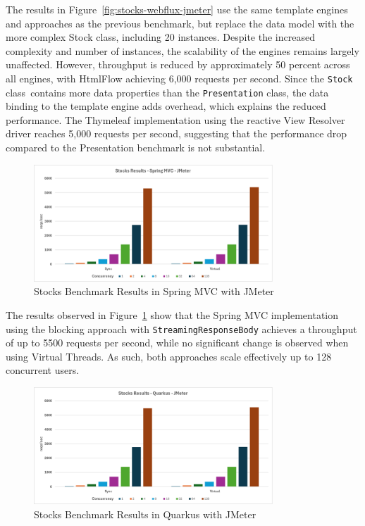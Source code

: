 The results in Figure~\ref{fig:stocks-webflux-jmeter} use the same template
engines and approaches as the previous benchmark, but replace the data model
with the more complex Stock class, including 20 instances. Despite the
increased complexity and number of instances, the scalability of the engines
remains largely unaffected. However, throughput is reduced by approximately 50
percent across all engines, with HtmlFlow achieving 6,000 requests per second.
Since the \texttt{Stock} class\ contains more data properties than the
\texttt{Presentation} class, the data binding to the template engine adds
overhead, which explains the reduced performance. The Thymeleaf implementation
using the reactive View Resolver driver reaches 5,000 requests per second,
suggesting that the performance drop compared to the Presentation benchmark is
not substantial.

\begin{figure}[h]
     \isPreprints{\centering}{}
     \includegraphics[width=0.8\textwidth]{./Graphs/stocks-springmvc-jmeter.png}
     \caption{Stocks Benchmark Results in Spring MVC with JMeter}\label{fig:stocks-springmvc-jmeter}
\end{figure}

The results observed in Figure~\ref{fig:stocks-springmvc-jmeter} show that the
Spring MVC implementation using the blocking approach with
\texttt{StreamingResponseBody} achieves a throughput of up to 5500 requests per
second, while no significant change is observed when using Virtual Threads. As
such, both approaches scale effectively up to 128 concurrent users.

\begin{figure}[h]
     \isPreprints{\centering}{}
     \includegraphics[width=0.8\textwidth]{./Graphs/stocks-quarkus-jmeter.png}
     \caption{Stocks Benchmark Results in Quarkus with JMeter}\label{fig:stocks-quarkus-jmeter}
\end{figure}


